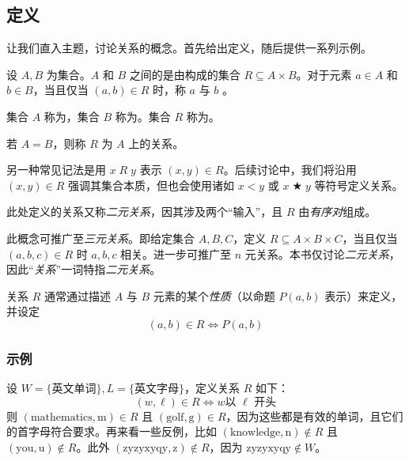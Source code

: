 
\subsection{定义}

让我们直入主题，讨论关系的概念。首先给出定义，随后提供一系列示例。

\begin{definition}
    设 $A, B$ 为集合。$A$ 和 $B$ 之间的是由构成的集合 $R \subseteq A \times B$。对于元素 $a \in A$ 和 $b \in B$，当且仅当 $(a, b) \in R$ 时，称 $a$ 与 $b$ 。

    集合 $A$ 称为，集合 $B$ 称为。集合 $R$ 称为。
    
    若 $A = B$，则称 $R$ 为 $A$ 上的关系。
\end{definition}

另一种常见记法是用 $x \;R\; y$ 表示 $(x,y) \in R$。后续讨论中，我们将沿用 $(x, y) \in R$ 强调其集合本质，但也会使用诸如 $x < y$ 或 $x \;\bigstar\; y$ 等符号定义关系。

\begin{remark}
    此处定义的关系又称\emph{二元关系}，因其涉及两个``输入''，且 $R$ 由\emph{有序对}组成。

    此概念可推广至\emph{三元关系}。即给定集合 $A,B,C$，定义 $R \subseteq A \times B \times C$，当且仅当 $(a, b, c) \in R$ 时 $a,b,c$ 相关。进一步可推广至 $n$ 元关系。本书仅讨论\emph{二元关系}，因此``\emph{关系}''一词特指\emph{二元关系}。
\end{remark}

\begin{remark}
    关系 $R$ 通常通过描述 $A$ 与 $B$ 元素的某个\emph{性质}（以命题 $P(a,b)$ 表示）来定义，并设定
    \[(a,b) \in R \iff P(a,b)\]
\end{remark}

\subsubsection*{示例}

\begin{example}
    设 $W=\{\text{英文单词}\}, L=\{\text{英文字母}\}$，定义关系 $R$ 如下：
    \[(w, \ell) \in R \iff w \text{以\ } \ell \text{\ 开头}\]
    则 $(\text{mathematics},\text{m}) \in R$ 且 $(\text{golf},\text{g}) \in R$，因为这些都是有效的单词，且它们的首字母符合要求。再来看一些反例，比如 $(\text{knowledge},\text{n}) \notin R$ 且 $(\text{you},\text{u}) \notin R$。此外 $(\text{zyzyxyqy},\text{z}) \notin R$，因为 $\text{zyzyxyqy} \notin W$。
\end{example}

